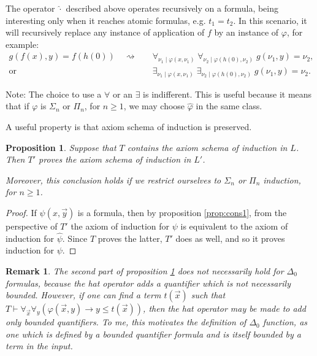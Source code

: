 \documentclass{article}
\newtheorem{prop}[theorem]{Proposition}
\newtheorem{remark}[theorem]{Remark}
\theoremstyle{nonumberplain}
\newtheorem{proof}{Proof}
\begin{document}
The operator $\hat\cdot$ described above operates recursively on a formula, being interesting only when it reaches atomic formulas, e.g. $t_1 = t_2$. In this scenario, it will recursively replace any instance of application of $f$ by an instance of $\varphi$, for example:
\begin{equation}
\begin{aligned}
g(f(x),y) = f(h(0)) \quad\rightsquigarrow\quad& \forall_{\nu_1 \mid \varphi(x, \nu_1)} \; \forall_{\nu_2 \mid \varphi(h(0), \nu_2)} \; g(\nu_1, y) = \nu_2,\\
\text{or }& \exists_{\nu_1 \mid \varphi(x, \nu_1)} \; \exists_{\nu_2 \mid \varphi(h(0), \nu_2)} \; g(\nu_1, y) = \nu_2.
\end{aligned}
\end{equation}

Note: The choice to use a $\forall$ or an $\exists$ is indifferent. This is useful because it means that if $\varphi$ is $\Sigma_n$ or $\Pi_n$, for $n \geq 1$, we may choose $\hat\varphi$ in the same class.

A useful property is that axiom schema of induction is preserved.
\begin{prop}\label{prop:cons2}
Suppose that $T$ contains the axiom schema of induction in $L$. Then $T'$ proves the axiom schema of induction in $L'$.

Moreover, this conclusion holds if we restrict ourselves to $\Sigma_n$ or $\Pi_n$ induction, for $n \geq 1$.
\end{prop}

\begin{proof}
If $\psi(x, \vec y)$ is a formula, then by proposition \ref{prop:cons1}, from the perspective of $T'$ the axiom of induction for $\psi$ is equivalent to the axiom of induction for $\hat\psi$. Since $T$ proves the latter, $T'$ does as well, and so it proves induction for $\psi$.
\end{proof}

\begin{remark}\label{rmk:delta0}
The second part of proposition \ref{prop:cons2} does not necessarily hold for $\Delta_0$ formulas, because the hat operator adds a quantifier which is not necessarily bounded. However, if one can find a term $t(\vec x)$ such that $T \vdash \forall_{\vec x} \forall_y (\varphi(\vec x, y) \rightarrow y \leq t(\vec x))$, then the hat operator may be made to add only bounded quantifiers. To me, this motivates the definition of $\Delta_0$ function, as one which is defined by a bounded quantifier formula and is itself bounded by a term in the input.
\end{remark}
\end{document}
